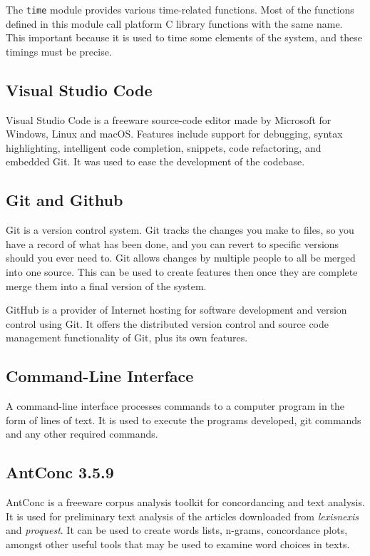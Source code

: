 The \verb|time| module provides various time-related functions. Most of the functions defined in this module call platform C library functions with the same name. This important because it is used to time some elements of the system, and these timings must be precise.

\subsection{Visual Studio Code}

Visual Studio Code is a freeware source-code editor made by Microsoft for Windows, Linux and macOS. Features include support for debugging, syntax highlighting, intelligent code completion, snippets, code refactoring, and embedded Git. It was used to ease the development of the codebase.

\subsection{Git and Github}

Git is a version control system. Git tracks the changes you make to files, so you have a record of what has been done, and you can revert to specific versions should you ever need to. Git allows changes by multiple people to all be merged into one source. This can be used to create features then once they are complete merge them into a final version of the system.

GitHub is a provider of Internet hosting for software development and version control using Git. It offers the distributed version control and source code management functionality of Git, plus its own features.

\subsection{Command-Line Interface}

A command-line interface processes commands to a computer program in the form of lines of text. It is used to execute the programs developed, git commands and any other required commands.

\subsection{AntConc 3.5.9}

AntConc is a freeware corpus analysis toolkit for concordancing and text analysis. It is used for preliminary text analysis of the articles downloaded from \emph{lexisnexis} and \emph{proquest}. It can be used to create words lists, n-grams, concordance plots, amongst other useful tools that may be used to examine word choices in texts.

